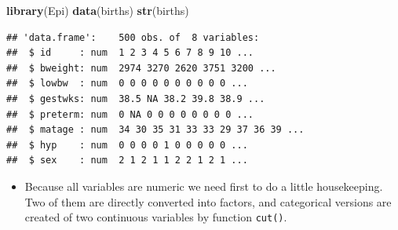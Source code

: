 \documentclass[
]{book}
\newenvironment{Shaded}{\begin{snugshade}}{\end{snugshade}}
\newcommand{\AttributeTok}[1]{\textcolor[rgb]{0.13,0.29,0.53}{#1}}
\newcommand{\ConstantTok}[1]{\textcolor[rgb]{0.56,0.35,0.01}{#1}}
\newcommand{\DecValTok}[1]{\textcolor[rgb]{0.00,0.00,0.81}{#1}}
\newcommand{\FunctionTok}[1]{\textcolor[rgb]{0.13,0.29,0.53}{\textbf{#1}}}
\newcommand{\NormalTok}[1]{#1}
\newcommand{\OtherTok}[1]{\textcolor[rgb]{0.56,0.35,0.01}{#1}}
\newcommand{\SpecialCharTok}[1]{\textcolor[rgb]{0.81,0.36,0.00}{\textbf{#1}}}
\newcommand{\StringTok}[1]{\textcolor[rgb]{0.31,0.60,0.02}{#1}}
\providecommand{\tightlist}{%
  \setlength{\itemsep}{0pt}\setlength{\parskip}{0pt}}
\theoremstyle{definition}
\theoremstyle{definition}
\theoremstyle{definition}
\theoremstyle{definition}
\theoremstyle{remark}
\begin{document}
\begin{Shaded}
\begin{Highlighting}[]
\FunctionTok{library}\NormalTok{(Epi)}
\FunctionTok{data}\NormalTok{(births)}
\FunctionTok{str}\NormalTok{(births)}
\end{Highlighting}
\end{Shaded}

\begin{verbatim}
## 'data.frame':    500 obs. of  8 variables:
##  $ id     : num  1 2 3 4 5 6 7 8 9 10 ...
##  $ bweight: num  2974 3270 2620 3751 3200 ...
##  $ lowbw  : num  0 0 0 0 0 0 0 0 0 0 ...
##  $ gestwks: num  38.5 NA 38.2 39.8 38.9 ...
##  $ preterm: num  0 NA 0 0 0 0 0 0 0 0 ...
##  $ matage : num  34 30 35 31 33 33 29 37 36 39 ...
##  $ hyp    : num  0 0 0 0 1 0 0 0 0 0 ...
##  $ sex    : num  2 1 2 1 1 2 2 1 2 1 ...
\end{verbatim}

\begin{itemize}
\tightlist
\item
  Because all variables are numeric we need first to do a little housekeeping.
  Two of them are directly converted into factors,
  and categorical versions are created of two continuous variables by function \texttt{cut()}.
\end{itemize}

\begin{Shaded}
\end{Shaded}
\end{document}
